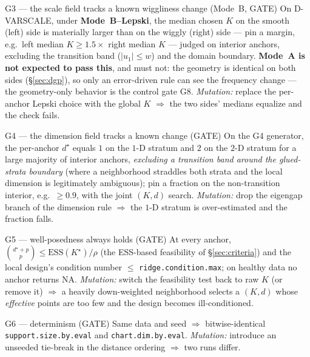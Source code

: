 \documentclass[11pt]{article}
\newcommand{\code}[1]{\texttt{#1}}
\begin{document}
\begin{gate}{G3 --- the scale field tracks a known wiggliness change (Mode~B, GATE)}
On D-VARSCALE, under \textbf{Mode~B--Lepski}, the median chosen $K$ on the smooth (left)
side is materially larger than on the wiggly (right) side --- pin a margin, e.g.\ left
median $K \ge 1.5\times$ right median $K$ --- judged on interior anchors, excluding the
transition band ($|u_1|\le w$) and the domain boundary. \textbf{Mode~A is not expected to
pass this}, and must not: the geometry is identical on both sides (\S\ref{sec:dgp}), so
only an error-driven rule can see the frequency change --- the geometry-only behavior is
the control gate G8. \emph{Mutation:} replace the per-anchor Lepski choice with the global
$K$ $\Rightarrow$ the two sides' medians equalize and the check fails.
\end{gate}

\begin{gate}{G4 --- the dimension field tracks a known change (GATE)}
On the G4 generator, the per-anchor $d^\star$ equals $1$ on the $1$-D stratum and $2$ on
the $2$-D stratum for a large majority of interior anchors, \emph{excluding a transition
band around the glued-strata boundary} (where a neighborhood straddles both strata and the
local dimension is legitimately ambiguous); pin a fraction on the non-transition interior,
e.g.\ $\ge 0.9$, with the joint $(K,d)$ search. \emph{Mutation:} drop the eigengap branch
of the dimension rule $\Rightarrow$ the $1$-D stratum is over-estimated and the fraction
falls.
\end{gate}

\begin{gate}{G5 --- well-posedness always holds (GATE)}
At every anchor, $\binom{d^\star+p}{p}\le \mathrm{ESS}(K^\star)/\rho$ (the ESS-based
feasibility of \S\ref{sec:criteria}) and the local design's condition number $\le$
\code{ridge.condition.max}; on healthy data no anchor returns NA. \emph{Mutation:} switch
the feasibility test back to raw $K$ (or remove it) $\Rightarrow$ a heavily down-weighted
neighborhood selects a $(K,d)$ whose \emph{effective} points are too few and the design
becomes ill-conditioned.
\end{gate}

\begin{gate}{G6 --- determinism (GATE)}
Same data and seed $\Rightarrow$ bitwise-identical \code{support.size.by.eval} and
\code{chart.dim.by.eval}. \emph{Mutation:} introduce an unseeded tie-break in the
distance ordering $\Rightarrow$ two runs differ.
\end{gate}
\end{document}
